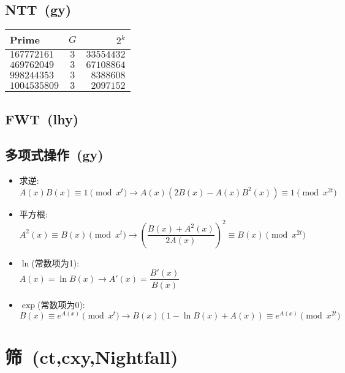     \subsection*{NTT\ \small(gy)}
        \begin{tabular}{l c r}
            \hline
            Prime & $ G $ & $ 2^k $\\\hline
            $ 167772161 $ & $ 3 $ & $ 33554432 $\\\hline
            $ 469762049 $ & $ 3 $ & $ 67108864 $\\\hline
            $ 998244353 $ & $ 3 $ & $ 8388608 $\\\hline
            $ 1004535809 $ & $ 3 $ & $ 2097152 $\\\hline
        \end{tabular}
    \subsection*{FWT\ \small(lhy)}
    \subsection*{多项式操作\ \small(gy)}
        \begin{itemize}[wide=0pt]
            \item 求逆:
            \\$ A(x) B(x) \equiv 1 \pmod{x^t} \to A(x) (2B(x) - A(x) B^2(x)) \equiv 1 \pmod{x^{2t}} $
            \item 平方根:
            \\$ A^2(x) \equiv B(x) \pmod{x^t} \to (\dfrac{B(x) + A^2(x)}{2A(x)})^2 \equiv B(x) \pmod{x^{2t}} $
            \item $ \ln $(常数项为1):
            \\$ A(x) = \ln B(x) \to A'(x) = \dfrac{B'(x)}{B(x)} $
            \item $ \exp $(常数项为0):
            \\$ B(x) \equiv e^{A(x)} \pmod{x^t} \to B(x) (1 - \ln B(x) + A(x)) \equiv e^{A(x)} \pmod{x^{2t}} $
        \end{itemize}

\section{筛\ \small(ct,cxy,Nightfall)}

